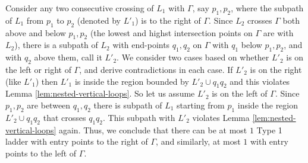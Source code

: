 \documentclass[10pt,a4paper]{amsart}
\theoremstyle{thmstyleone}
\begin{document}
    Consider any two consecutive crossing of $L_1$ with $\Gamma$, say $p_1,p_2$, where the subpath of $L_1$ from $p_1$ to $p_2$ (denoted by $L'_1$) is to the right of $\Gamma$. Since $L_2$ crosses $\Gamma$ both above and below $p_1,p_2$ (the lowest and highst intersection points on $\Gamma$ are with $L_2$), there is a subpath of $L_2$ with end-points $q_1,q_2$ on $\Gamma$ with $q_1$ below $p_1,p_2$, and with $q_2$ above them, call it $L'_2$. We consider two cases based on whether $L'_2$ is on the left or right of $\Gamma$, and derive contradictions in each case. If $L'_2$ is on the right (like $L'_1$) then $L'_1$ is inside the
    region bounded by $L'_2\cup q_1q_2$ and this violates Lemma \ref{lem:nested-vertical-loops}.
    So let us assume $L'_2$ is on the left of $\Gamma$. Since $p_1,p_2$ are between $q_1,q_2$ there is subpath of $L_1$ starting from $p_1$ inside the region $L'_2\cup q_1q_2$ that crosses $q_1q_2$. This subpath with $L'_2$ violates Lemma \ref{lem:nested-vertical-loops} again.
    Thus, we conclude that there can be at most $1$ Type 1 ladder with entry points to the right of $\Gamma$, and similarly, at most $1$ with entry points to the left of $\Gamma$. 
    
\end{document}
